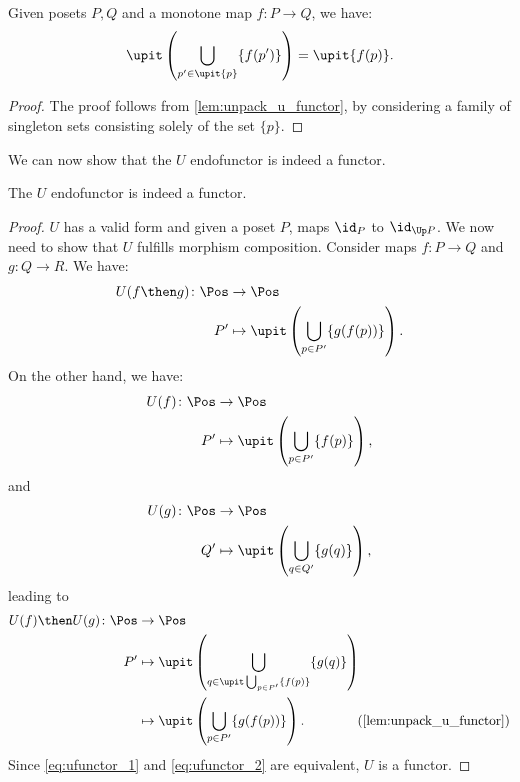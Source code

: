 \begin{lemma}
  \label{lem:unpack_part_2}
  Given posets $P,Q$ and a monotone map $f\colon P\to Q$, we have:
  \begin{equation}
    \upit \left( \bigcup_{p'\in \upit \{p\}} \{f(p')\}\right)=\upit \{f(p)\}.
  \end{equation}
\end{lemma}
\begin{proof}
  The proof follows from \cref{lem:unpack_u_functor}, by considering a family of singleton sets consisting solely of the set $\{p\}$.
\end{proof}
We can now show that the $U$ endofunctor is indeed a functor.
\begin{lemma}
  The $U$ endofunctor is indeed a functor.
\end{lemma}
\begin{proof}
  $U$ has a valid form and given a poset $P$, maps $\id_P$ to $\id_{\Up P}$. We now need to show that $U$ fulfills morphism composition. Consider maps $f\colon P \to Q$ and $g\colon Q \to R$. We have:
  \begin{equation}
    \label{eq:ufunctor_1}
    \begin{aligned}
      U(f\then g)\colon \Pos &\to \Pos\\
      P'&\mapsto \upit \left( \bigcup_{p\in P'} \{g(f(p))\}\right).
    \end{aligned}
  \end{equation}
  On the other hand, we have:
  \begin{equation}
    \begin{aligned}
      U(f)\colon \Pos &\to \Pos\\
      P'&\mapsto \upit \left( \bigcup_{p\in P'}\{f(p)\}\right),
    \end{aligned}
  \end{equation}
  and
  \begin{equation}
    \begin{aligned}
      U(g)\colon \Pos &\to \Pos\\
      Q'&\mapsto \upit \left( \bigcup_{q\in Q'}\{g(q)\}\right),
    \end{aligned}
  \end{equation}
  leading to
  \begin{equation}
    \label{eq:ufunctor_2}
    \begin{aligned}
      U(f)\then U(g)\colon \Pos &\to \Pos\\
      P'&\mapsto \upit\left( \bigcup_{q\in \upit \bigcup_{p\in P'}\{f(p)\}}\{g(q)\}\right)\\
      &\mapsto \upit \left(\bigcup_{p\in P'} \{ g(f(p))\}\right). \qquad \qquad (\cref{lem:unpack_u_functor})
    \end{aligned}
  \end{equation}
  Since \cref{eq:ufunctor_1} and \cref{eq:ufunctor_2} are equivalent, $U$ is a functor.
\end{proof}
